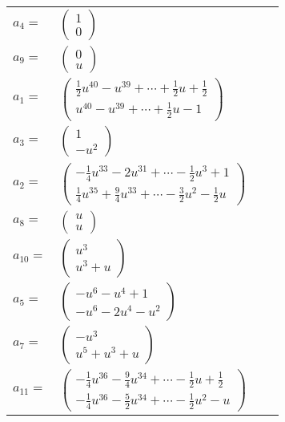 \documentclass[1p]{elsarticle_modified}
\theoremstyle{definition}
\begin{document}
\begin{tabular}{m{7pt} m{180pt} m{7pt} m{180pt} }
\flushright $a_{4}=$&$\begin{pmatrix}1\\0\end{pmatrix}$ \\
\flushright $a_{9}=$&$\begin{pmatrix}0\\u\end{pmatrix}$ \\
\flushright $a_{1}=$&$\begin{pmatrix}\frac{1}{2} u^{40}- u^{39}+\cdots+\frac{1}{2} u+\frac{1}{2}\\u^{40}- u^{39}+\cdots+\frac{1}{2} u-1\end{pmatrix}$ \\
\flushright $a_{3}=$&$\begin{pmatrix}1\\- u^2\end{pmatrix}$ \\
\flushright $a_{2}=$&$\begin{pmatrix}-\frac{1}{4} u^{33}-2 u^{31}+\cdots-\frac{1}{2} u^3+1\\\frac{1}{4} u^{35}+\frac{9}{4} u^{33}+\cdots-\frac{3}{2} u^2-\frac{1}{2} u\end{pmatrix}$ \\
\flushright $a_{8}=$&$\begin{pmatrix}u\\u\end{pmatrix}$ \\
\flushright $a_{10}=$&$\begin{pmatrix}u^3\\u^3+u\end{pmatrix}$ \\
\flushright $a_{5}=$&$\begin{pmatrix}- u^6- u^4+1\\- u^6-2 u^4- u^2\end{pmatrix}$ \\
\flushright $a_{7}=$&$\begin{pmatrix}- u^3\\u^5+u^3+u\end{pmatrix}$ \\
\flushright $a_{11}=$&$\begin{pmatrix}-\frac{1}{4} u^{36}-\frac{9}{4} u^{34}+\cdots-\frac{1}{2} u+\frac{1}{2}\\-\frac{1}{4} u^{36}-\frac{5}{2} u^{34}+\cdots-\frac{1}{2} u^2- u\end{pmatrix}$ \\

\end{tabular}
\end{document}
